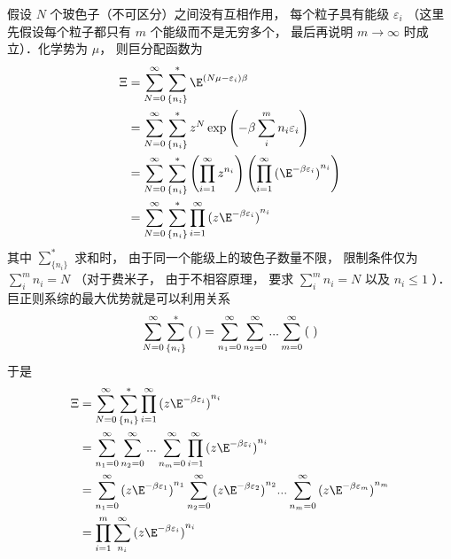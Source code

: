 
假设 $N$ 个玻色子（不可区分）之间没有互相作用， 每个粒子具有能级 ${\varepsilon _i}$ （这里先假设每个粒子都只有 $m$ 个能级而不是无穷多个， 最后再说明 $m \to \infty $ 时成立）．化学势为 $\mu $，  则巨分配函数为
\begin{equation}
  \begin{aligned}
\Xi & = \sum\limits_{N = 0}^\infty  {\sum\limits_{\{ {n_i}\} }^ *  {{\E^{(N\mu  - {\varepsilon _i})\beta }}} }  \\
& = \sum\limits_{N = 0}^\infty  {\sum\limits_{\{ {n_i}\} }^ *  {{z^N}\exp \left( { - \beta \sum\limits_i^m {{n_i}{\varepsilon _i}} } \right)} }  \\
& = \sum\limits_{N = 0}^\infty  {\sum\limits_{\{ {n_i}\} }^ *  {\left( {\prod\limits_{i = 1}^\infty  {{z^{{n_i}}}} } \right)\left( {\prod\limits_{i = 1}^\infty  {{{({\E^{ - \beta {\varepsilon _i}}})}^{{n_i}}}} } \right)} } \\
& = \sum\limits_{N = 0}^\infty  {\sum\limits_{\{ {n_i}\} }^ *  {\prod\limits_{i = 1}^\infty  {{{(z{\E^{ - \beta {\varepsilon _i}}})}^{{n_i}}}} } }
\end{aligned}
\end{equation}
其中 $\sum\limits_{\{ {n_i}\} }^ *  {} $ 求和时， 由于同一个能级上的玻色子数量不限， 限制条件仅为 $\sum\limits_i^m {{n_i}}  = N$ （对于费米子， 由于不相容原理， 要求 $\sum\limits_i^m {{n_i}}  = N$ 以及 ${n_i} \le 1$ ）．\\
巨正则系综的最大优势就是可以利用关系
\begin{equation}
  \sum\limits_{N = 0}^\infty  {\sum\limits_{\{ {n_i}\} }^ *  {({\kern 1pt} {\kern 1pt} {\kern 1pt} )} }  = \sum\limits_{{n_1} = 0}^\infty  {\sum\limits_{{n_2} = 0}^\infty  {...\sum\limits_{m = 0}^\infty  {({\kern 1pt} {\kern 1pt} {\kern 1pt} )} } } 
\end{equation}
于是
\begin{equation}
  \begin{aligned}
\Xi & = \sum\limits_{N = 0}^\infty  {\sum\limits_{\{ {n_i}\} }^ *  {\prod\limits_{i = 1}^\infty  {{{(z{\E^{ - \beta {\varepsilon _i}}})}^{{n_i}}}} } }  \\
& = \sum\limits_{{n_1} = 0}^\infty  {\sum\limits_{{n_2} = 0}^\infty  {...\sum\limits_{{n_m} = 0}^\infty  {\prod\limits_{i = 1}^\infty  {{{(z{\E^{ - \beta {\varepsilon _i}}})}^{{n_i}}}} } } }  \\
& = \sum\limits_{{n_1} = 0}^\infty  {{{(z{\E^{ - \beta {\varepsilon _1}}})}^{{n_1}}}\sum\limits_{{n_2} = 0}^\infty  {{{(z{\E^{ - \beta {\varepsilon _2}}})}^{{n_2}}}...\sum\limits_{{n_m} = 0}^\infty  {{{(z{\E^{ - \beta {\varepsilon _m}}})}^{{n_m}}}} } } \\
& = \prod\limits_{i = 1}^m {\sum\limits_{{n_i}}^\infty  {{{(z{\E^{ - \beta {\varepsilon _i}}})}^{{n_i}}}} }
\end{aligned}
\end{equation}
